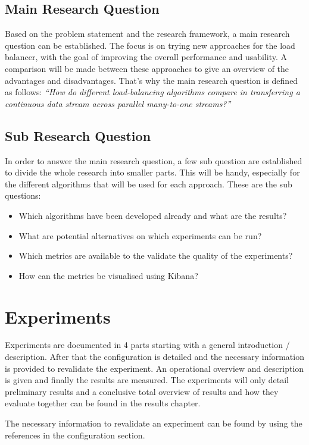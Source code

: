 \documentclass[]{article}
\begin{document}
\subsection{Main Research Question}
Based on the problem statement and the research framework, a main research question can be established. The focus is on trying new approaches for the load balancer, with the goal of improving the overall performance and usability. A comparison will be made between these approaches to give an overview of the advantages and disadvantages. That’s why the main research question is defined as follows: \textit{“How do different load-balancing algorithms compare in transferring a continuous data stream across parallel many-to-one streams?”}

\subsection{Sub Research Question}
In order to answer the main research question, a few sub question are established to divide the whole research into smaller parts. This will be handy, especially for the different algorithms that will be used for each approach. These are the sub questions:
\begin{itemize}
	\itemsep 0em
	\item Which algorithms have been developed already and what are the results?
	\item What are potential alternatives on which experiments can be run?
	\item Which metrics are available to the validate the quality of the experiments?
	\item How can the metrics be visualised using Kibana?
\end{itemize}


\section{Experiments}
Experiments are documented in 4 parts starting with a general introduction / description. After that the configuration is detailed and the necessary information is provided to revalidate the experiment. An operational overview and description is given and finally the results are measured. The experiments will only detail preliminary results and a conclusive total overview of results and how they evaluate together can be found in the results chapter. 

The necessary information to revalidate an experiment can be found by using the references in the configuration section.
\end{document}

